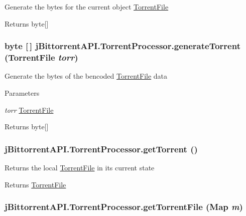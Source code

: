 \label{classj_bittorrent_a_p_i_1_1_torrent_processor_a8ac41276f857bafc5e0facbe615a3332}
Generate the bytes for the current object \hyperlink{classj_bittorrent_a_p_i_1_1_torrent_file}{TorrentFile} \begin{DoxyReturn}{Returns}
byte\mbox{[}\mbox{]} 
\end{DoxyReturn}
\hypertarget{classj_bittorrent_a_p_i_1_1_torrent_processor_aa77ab40de555dd36070fa2d5a332db21}{
\subsubsection[{generateTorrent}]{\setlength{\rightskip}{0pt plus 5cm}byte \mbox{[}$\,$\mbox{]} jBittorrentAPI.TorrentProcessor.generateTorrent ({\bf TorrentFile} {\em torr})}}
\label{classj_bittorrent_a_p_i_1_1_torrent_processor_aa77ab40de555dd36070fa2d5a332db21}
Generate the bytes of the bencoded \hyperlink{classj_bittorrent_a_p_i_1_1_torrent_file}{TorrentFile} data 
\begin{DoxyParams}{Parameters}
\item[{\em torr}]\hyperlink{classj_bittorrent_a_p_i_1_1_torrent_file}{TorrentFile} \end{DoxyParams}
\begin{DoxyReturn}{Returns}
byte\mbox{[}\mbox{]} 
\end{DoxyReturn}
\hypertarget{classj_bittorrent_a_p_i_1_1_torrent_processor_a2d163f91f70948c6bdd0970e3d124bf2}{
\subsubsection[{getTorrent}]{ jBittorrentAPI.TorrentProcessor.getTorrent ()}}
\label{classj_bittorrent_a_p_i_1_1_torrent_processor_a2d163f91f70948c6bdd0970e3d124bf2}
Returns the local \hyperlink{classj_bittorrent_a_p_i_1_1_torrent_file}{TorrentFile} in its current state \begin{DoxyReturn}{Returns}
\hyperlink{classj_bittorrent_a_p_i_1_1_torrent_file}{TorrentFile} 
\end{DoxyReturn}
\hypertarget{classj_bittorrent_a_p_i_1_1_torrent_processor_aba7d3c3578e5dc678fd988982871d7c7}{
\subsubsection[{getTorrentFile}]{ jBittorrentAPI.TorrentProcessor.getTorrentFile (Map {\em m})}}
